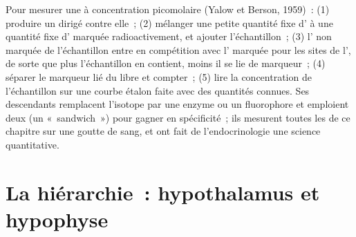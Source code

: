 \begin{method}\label{met:b3:endocrinology:ria}
Pour mesurer une  à concentration picomolaire (Yalow et Berson,
1959)~: (1) produire un  dirigé contre elle~; (2) mélanger une
petite quantité fixe d' à une quantité fixe d' marquée
radioactivement, et ajouter l'échantillon~; (3) l' non marquée de
l'échantillon entre en compétition avec l' marquée pour les
sites de l', de sorte que plus l'échantillon en contient, moins
il se lie de marqueur~; (4) séparer le marqueur lié du libre et compter~;
(5) lire la concentration de l'échantillon sur une courbe étalon faite
avec des quantités connues. Ses descendants remplacent l'isotope par une
enzyme ou un fluorophore et emploient deux  (un «~sandwich~»)
pour gagner en spécificité~; ils mesurent toutes les  de ce
chapitre sur une goutte de sang, et ont fait de l'endocrinologie une
science quantitative.
\end{method}

\section{La hiérarchie~: hypothalamus et hypophyse}


